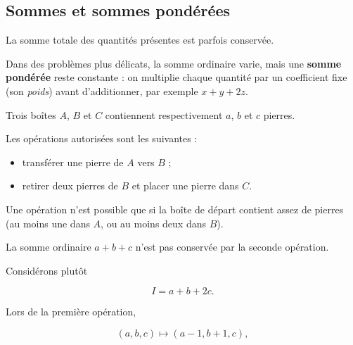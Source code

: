 \documentclass[11pt]{article}
\begin{document}
\subsection{Sommes et sommes pondérées}\label{sec:sommes-ponderees}

La somme totale des quantités présentes est parfois conservée.

Dans des problèmes plus délicats, la somme ordinaire varie, mais une
\textbf{somme pondérée} reste constante : on multiplie chaque quantité par un
coefficient fixe (son \emph{poids}) avant d'additionner, par exemple
\(x+y+2z\).

\begin{exemple}\label{exm:trois-boites}
Trois boîtes \(A\), \(B\) et \(C\) contiennent respectivement \(a\), \(b\) et
\(c\) pierres.

Les opérations autorisées sont les suivantes :

\begin{itemize}
    \item transférer une pierre de \(A\) vers \(B\) ;
    \item retirer deux pierres de \(B\) et placer une pierre dans \(C\).
\end{itemize}

Une opération n'est possible que si la boîte de départ contient assez de
pierres (au moins une dans \(A\), ou au moins deux dans \(B\)).

\begin{center}
\end{center}

La somme ordinaire \(a+b+c\) n'est pas conservée par la seconde opération.

Considérons plutôt

\[
I=a+b+2c.
\]

Lors de la première opération,

\[
(a,b,c)\longmapsto(a-1,b+1,c),
\]


\end{exemple}
\end{document}
